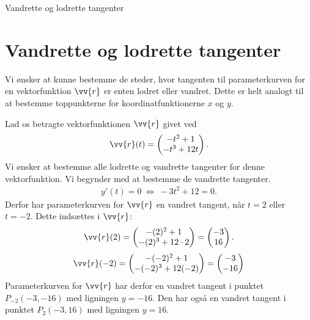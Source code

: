 \begin{center}
	\Huge
	Vandrette og lodrette tangenter
\end{center}
\section*{Vandrette og lodrette tangenter}

Vi ønsker at kunne bestemme de steder, hvor tangenten til parameterkurven for en vektorfunktion $\vv{r}$ er enten lodret eller vandret. Dette er helt analogt til at bestemme toppunkterne for koordinatfunktionerne $x$ og $y$. 

\begin{exa}
	Lad os betragte vektorfunktionen $\vv{r}$ givet ved
	\begin{align*}
		\vv{r}(t) =
		\begin{pmatrix}
			-t^2+1 \\
			-t^3+12t
		\end{pmatrix}.
	\end{align*}
	Vi ønsker at bestemme alle lodrette og vandrette tangenter for denne vektorfunktion. Vi begynder med at bestemme de vandrette tangenter. 
	\begin{align*}
		y'(t) = 0 \ \Leftrightarrow \ -3t^2+12 = 0.
	\end{align*}
	Derfor har parameterkurven for $\vv{r}$ en vandret tangent, når $t=2$ eller $t=-2$. Dette indsættes i $\vv{r}$:
	\begin{align*}
		\vv{r}(2) = 
		\begin{pmatrix}
			-(2)^2+1 \\
			-(2)^3+12\cdot 2
		\end{pmatrix} =
		\begin{pmatrix}
			-3 \\
			16
		\end{pmatrix}.
	\end{align*}
	\begin{align*}
		\vv{r}(-2) =
		\begin{pmatrix}
		-(-2)^2+1 \\
		-(-2)^3+12(-2)
		\end{pmatrix} =
		\begin{pmatrix}
			-3 \\
			-16
		\end{pmatrix}
	\end{align*}
	Parameterkurven for $\vv{r}$ har derfor en vandret tangent i punktet $P_{-2}(-3,-16)$ med ligningen $y=-16$. Den har også en vandret tangent i punktet $P_2(-3,16)$ med ligningen $y=16$. 

\end{exa}
